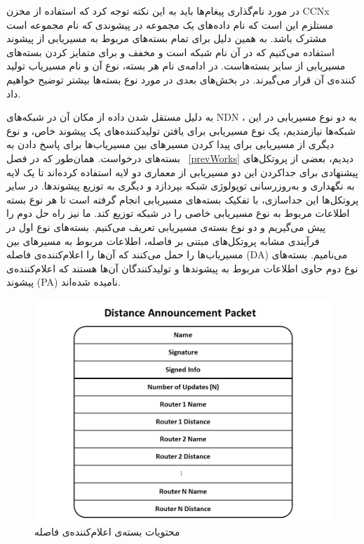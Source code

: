 در مورد نام‌گذاری پیغام‌ها باید به این نکته توجه کرد که استفاده از مخزن CCNx مستلزم این است که نام داده‌های یک مجموعه در پیشوندی که نام مجموعه است مشترک باشد. به همین دلیل برای تمام بسته‌های مربوط به مسیریابی از پیشوند  استفاده می‌کنیم که در آن  نام شبکه است و  مخفف  و برای متمایز کردن بسته‌های مسیریابی از سایر بسته‌هاست. در ادامه‌ی نام هر بسته، نوع آن و نام مسیریاب تولید کننده‌ی آن قرار می‌گیرند. در بخش‌های بعدی در مورد نوع بسته‌ها بیشتر توضیح خواهیم داد.


به دلیل مستقل شدن داده از مکان آن در شبکه‌های NDN ، به دو نوع مسیریابی در این شبکه‌ها نیازمندیم، یک نوع مسیریابی برای یافتن تولید‌کننده‌های یک پیشوند خاص، و نوع دیگری از مسیریابی برای پیدا کردن مسیرهای بین مسیریاب‌ها برای پاسخ دادن به بسته‌های درخواست. همان‌طور که در فصل  ~\ref{prevWorks} دیدیم، بعضی از پروتکل‌های پیشنهادی برای جداکردن این دو مسیریابی از معماری دو لایه استفاده کرده‌اند تا یک لایه به نگهداری و به‌روزرسانی توپولوژی شبکه بپردازد و دیگری به توزیع پیشوند‌ها. در سایر پروتکل‌ها این جداسازی، با تفکیک بسته‌های مسیریابی انجام گرفته است تا هر نوع بسته اطلاعات مربوط به نوع مسیریابی خاصی را در شبکه توزیع کند. ما نیز راه حل دوم را پیش می‌گیریم و دو نوع بسته‌ی مسیریابی تعریف می‌کنیم. بسته‌های نوع اول در فرآیندی مشابه پروتکل‌های مبتنی بر فاصله، اطلاعات مربوط به مسیرهای بین مسیریاب‌ها را حمل می‌کنند که آن‌ها را اعلام‌کننده‌ی فاصله (DA) می‌نامیم. بسته‌های نوع دوم حاوی اطلاعات مربوط به پیشوند‌ها و تولید‌کنندگان آن‌ها هستند که اعلام‌کننده‌ی پیشوند (PA) نامیده شده‌اند. 
\begin{figure}[hb!]
\centering
\includegraphics[scale=0.6]{./resources/figures/DA.png}
\caption{محتویات بسته‌ی اعلام‌کننده‌ی فاصله}
\label{fig:DA}
\end{figure}

